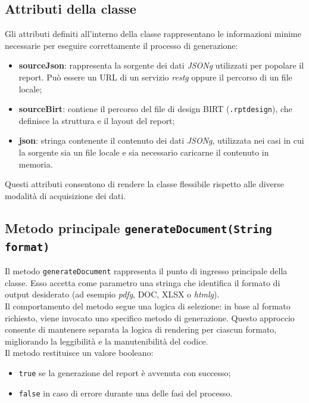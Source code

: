\subsection{Attributi della classe}
Gli attributi definiti all'interno della classe rappresentano le informazioni minime necessarie per eseguire correttamente il processo di generazione:
\begin{itemize}
    \item \textbf{sourceJson}: rappresenta la sorgente dei dati \emph{\gls{JSONg}} utilizzati per popolare il report. Può essere un URL di un servizio \emph{\gls{restg}} oppure il percorso di un file locale;
    
    \item \textbf{sourceBirt}: contiene il percorso del file di design BIRT (\texttt{.rptdesign}), che definisce la struttura e il layout del report;
    
    \item \textbf{json}: stringa contenente il contenuto dei dati \emph{\gls{JSONg}}, utilizzata nei casi in cui la sorgente sia un file locale e sia necessario caricarne il contenuto in memoria.
\end{itemize}

Questi attributi consentono di rendere la classe flessibile rispetto alle diverse modalità di acquisizione dei dati.

\subsection{Metodo principale \texttt{generateDocument(String format)}}
Il metodo \texttt{generateDocument} rappresenta il punto di ingresso principale della classe. Esso accetta come parametro una stringa che identifica il formato di output desiderato (ad esempio \emph{\gls{pdfg}}, DOC, XLSX o \emph{\gls{htmlg}}).\\
Il comportamento del metodo segue una logica di selezione: in base al formato richiesto, viene invocato uno specifico metodo di generazione. Questo approccio consente di mantenere separata la logica di rendering per ciascun formato, migliorando la leggibilità e la manutenibilità del codice.\\
Il metodo restituisce un valore booleano:
\begin{itemize}
    \item \texttt{true} se la generazione del report è avvenuta con successo;
    \item \texttt{false} in caso di errore durante una delle fasi del processo.
\end{itemize}

